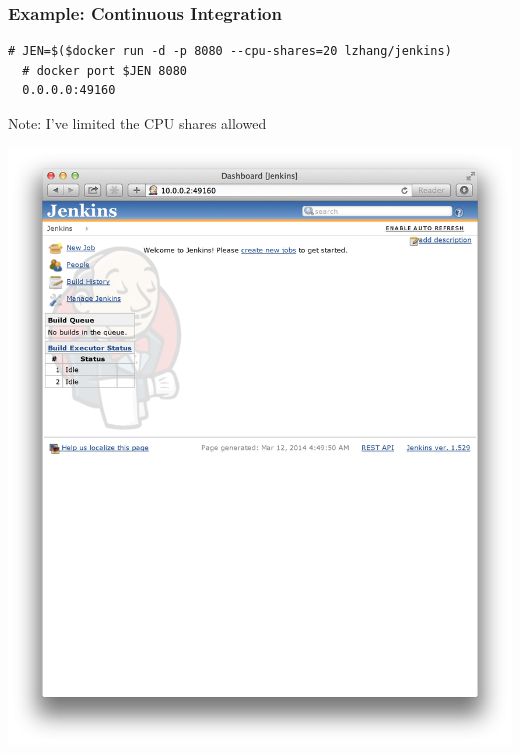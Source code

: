 \documentclass[xcolor=dvipsnames]{beamer}
\begin{document}
\begin{frame}[fragile]
  \frametitle{Example: Continuous Integration}
  \begin{lstlisting}[basicstyle=\tiny]
  # JEN=$($docker run -d -p 8080 --cpu-shares=20 lzhang/jenkins)
  # docker port $JEN 8080
  0.0.0.0:49160
  \end{lstlisting}

  Note: I've limited the CPU shares allowed
  
  \includegraphics[width=\textwidth]{figures/jenkins.png}
  
\end{frame}
\end{document}
